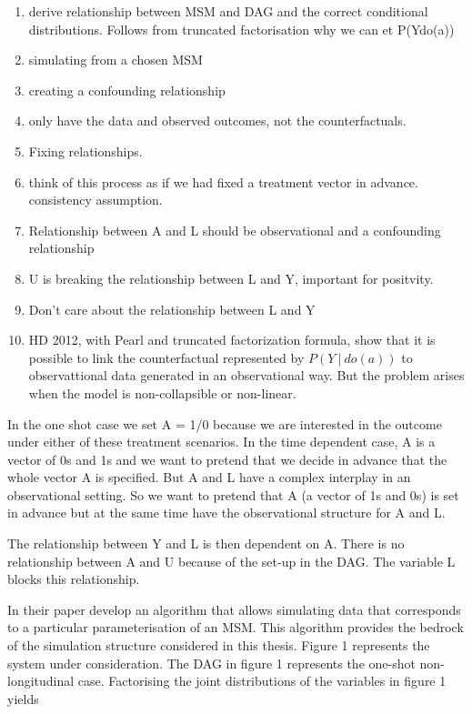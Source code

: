 \documentclass[11pt]{article}
\begin{document}
\begin{enumerate}
\def\labelenumi{\arabic{enumi}.}
\item
  derive relationship between MSM and DAG and the correct conditional
  distributions. Follows from truncated factorisation why we can et
  P(Y\textbar{}do(a))
\item
  simulating from a chosen MSM
\item
  creating a confounding relationship
\item
  only have the data and observed outcomes, not the counterfactuals.
\item
  Fixing relationships.
\item
  think of this process as if we had fixed a treatment vector in
  advance. consistency assumption.
\item
  Relationship between A and L should be observational and a confounding
  relationship
\item
  U is breaking the relationship between L and Y, important for
  positvity.
\item
  Don't care about the relationship between L and Y
\item
  HD 2012, with Pearl and truncated factorization formula, show that it
  is possible to link the counterfactual represented by
  \(P(Y\ |\ do(a))\) to observattional data generated in an
  observational way. But the problem arises when the model is
  non-collapsible or non-linear.
\end{enumerate}

In the one shot case we set A = 1/0 because we are interested in the
outcome under either of these treatment scenarios. In the time dependent
case, A is a vector of 0s and 1s and we want to pretend that we decide
in advance that the whole vector A is specified. But A and L have a
complex interplay in an observational setting. So we want to pretend
that A (a vector of 1s and 0s) is set in advance but at the same time
have the observational structure for A and L.

The relationship between Y and L is then dependent on A. There is no
relationship between A and U because of the set-up in the DAG. The
variable L blocks this relationship.

In their paper \citet{Havercroft2012} develop an algorithm that allows
simulating data that corresponds to a particular parameterisation of an
MSM. This algorithm provides the bedrock of the simulation structure
considered in this thesis. Figure 1 represents the system under
consideration. The DAG in figure 1 represents the one-shot
non-longitudinal case. Factorising the joint distributions of the
variables in figure 1 yields
\end{document}

